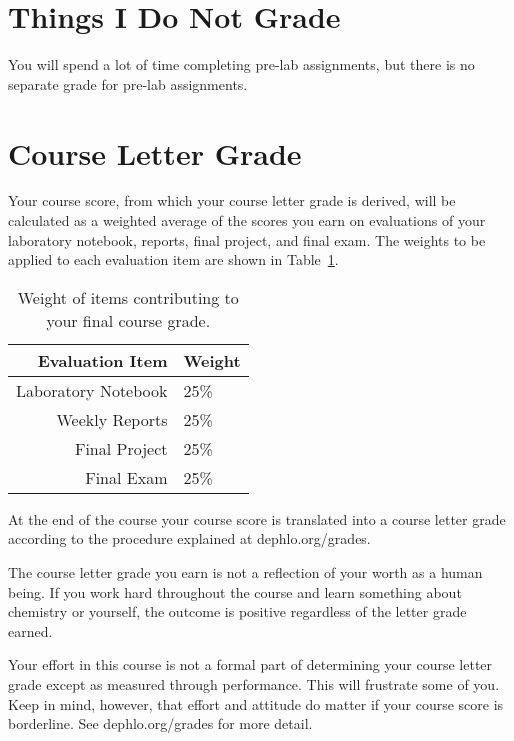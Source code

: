 \documentclass[letterpaper,oneside,onecolumn,11pt,article]{memoir}
\begin{document}
\section{Things I Do Not Grade}
You will spend a lot of time completing pre-lab assignments, but there is no separate grade for pre-lab assignments. 

\section{Course Letter Grade}
Your course score, from which your course letter grade is derived, will be calculated as a weighted average of the scores you earn on evaluations of your laboratory notebook, reports, final project, and final exam. The weights to be applied to each evaluation item are shown in Table~\ref{tab:weights}.

\begin{table}[h]
\caption{\sffamily Weight of items contributing to your final course grade.}
\label{tab:weights}
\begin{tabular}{r|l} \toprule
\textbf{Evaluation Item} & \textbf{Weight} \\ \hline
Laboratory Notebook & 25\% \\
Weekly Reports & 25\% \\
Final Project & 25\% \\
Final Exam & 25\% \\
\bottomrule
\end{tabular}
\end{table}

At the end of the course your course score is translated into a course letter grade according to the procedure explained at dephlo.org/grades. 

The course letter grade you earn is not a reflection of your worth as a human being. If you work hard throughout the course and learn something about chemistry or yourself, the outcome is positive regardless of the letter grade earned. 

Your effort in this course is not a formal part of determining your course letter grade except as measured through performance. This will frustrate some of you. Keep in mind, however, that effort and attitude do matter if your course score is borderline. See dephlo.org/grades for more detail. 
\end{document}
